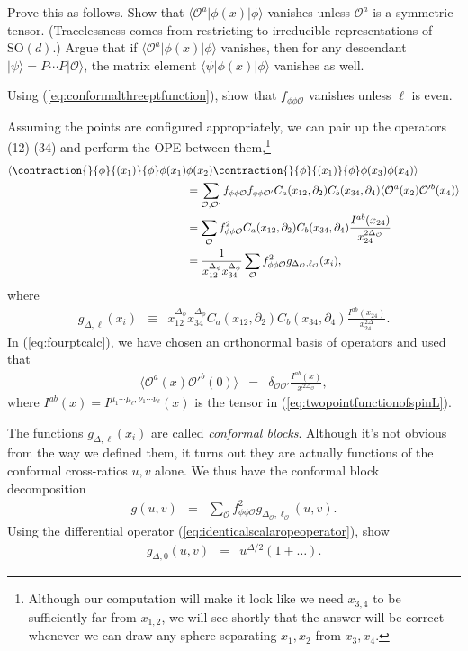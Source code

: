 \documentclass[12pt]{article}
\numberwithin{equation}{section}
\newcommand\be{\begin{eqnarray}}
\newcommand\ee{\end{eqnarray}}
\newcommand\f\phi
\newcommand\cO{\mathcal{O}}
\newcommand\p[1]{\left(#1\right)}
\newcommand\ptl\partial
\newcommand\<\langle
\renewcommand\>\rangle
\newcommand\de\delta
\newcommand\nn{\nonumber}
\renewcommand\.{\cdot}
\newcommand\SO{\mathrm{SO}}
\newcommand\De{\Delta}
\begin{document}
Prove this as follows. Show that $\<\cO^a|\f(x)|\f\>$ vanishes unless $\cO^a$ is a symmetric tensor.  (Tracelessness comes from restricting to irreducible representations of $\SO(d)$.) Argue that if $\<\cO^a|\f(x)|\f\>$ vanishes, then for any descendant $|\psi\>=P\cdots P|\cO\>$, the matrix element $\<\psi|\f(x)|\f\>$ vanishes as well.


\label{exercise:elleven}
Using (\ref{eq:conformalthreeptfunction}), show that $f_{\f\f\cO}$ vanishes unless $\ell$ is even.


Assuming the points are configured appropriately, we can pair up the operators (12) (34) and perform the OPE between them,\footnote{Although our computation will make it look like we need $x_{3,4}$ to be sufficiently far from $x_{1,2}$, we will see shortly that the answer will be correct whenever we can draw any sphere separating $x_1,x_2$ from $x_3,x_4$.}
\begin{align}
\label{eq:fourptcalc}
\<
\contraction{}{\f}{(x_1)}{\f}
\f(x_1)&\f(x_2)
\contraction{}{\f}{(x_1)}{\f}
\f(x_3)\f(x_4)
\>\nn\\
&= \sum_{\cO,\cO'}f_{\f\f\cO}f_{\f\f\cO'} C_a(x_{12},\ptl_2)C_b(x_{34},\ptl_4)\<\cO^a(x_2)\cO'^b(x_4)\>\nn\\
&= \sum_\cO f_{\f\f\cO}^2 C_a(x_{12},\ptl_2)C_b(x_{34},\ptl_4)\frac{I^{ab}(x_{24})}{x_{24}^{2\De_\cO}}\nn\\
&= \frac{1}{x_{12}^{\De_\f} x_{34}^{\De_\f}}\sum_\cO f_{\f\f\cO}^2 g_{\De_\cO,\ell_\cO}(x_i),
\end{align}
where
\be
\label{eq:olddefinitionofg}
g_{\De,\ell}(x_i) &\equiv& x_{12}^{\De_\f} x_{34}^{\De_\f} C_a(x_{12},\ptl_2)C_b(x_{34},\ptl_4)\frac{I^{ab}(x_{24})}{x_{24}^{2\De}}.
\ee
In (\ref{eq:fourptcalc}), we have chosen an orthonormal basis of operators and used that
\be
\label{eq:canonicallynormalizedtwopt}
\<\cO^a(x)\cO'^b(0)\> &=& \de_{\cO\cO'} \frac{I^{ab}(x)}{x^{2\De_\cO}},
\ee
where $I^{ab}(x)=I^{\mu_1\cdots\mu_\ell,\nu_1\cdots\nu_\ell}(x)$ is the tensor in (\ref{eq:twopointfunctionofspinL}).

The functions $g_{\De,\ell}(x_i)$ are called {\it conformal blocks}.  Although it's not obvious from the way we defined them, it turns out they are actually functions of the conformal cross-ratios $u,v$ alone.  We thus have the conformal block decomposition
\be
g(u,v) &=& \sum_\cO f_{\f\f\cO}^2 g_{\De_\cO,\ell_\cO}(u,v).
\ee
Using the differential operator (\ref{eq:identicalscalaropeoperator}), show
\be
\label{eq:boundaryconditionforblock}
g_{\De,0}(u,v) &=& u^{\De/2}\p{1+\dots}.
\ee
\end{document}
